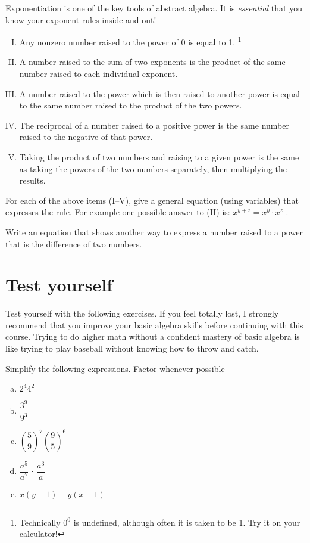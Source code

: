 Exponentiation is one of the key tools of abstract algebra. It is \emph{essential} that you know your exponent rules inside and out!  

\begin{enumerate}[(I)]
\item
Any nonzero number raised to the power of 0 is equal to 1.
\footnote{ Technically $0^0$ is undefined, although often it is taken to be 1. Try it on your calculator!}
\item
A number raised to the sum of two exponents  is the product of the same number raised to each individual exponent.
\item
A number raised to the power which is then raised to another power is equal to the same number raised to the product of the two powers.
\item
The reciprocal of a number raised to a positive power is the same number raised to the negative of that power.
\item
Taking the  product of two numbers  and raising to a given power is the same as taking the powers of the two numbers separately, then multiplying the results.
\end{enumerate}

\begin{exercise}{5}
For each of the above items (I--V),  give a general equation (using variables) that expresses the rule.  For example one possible answer to (II) is:  $x^{y+z} = x^y \cdot x^z$ .
\end{exercise}
\begin{exercise}{6}
Write an equation that shows another way to express a number raised to a power that is the difference of two numbers.
\end{exercise}

\section{Test yourself}
Test yourself with the following exercises. If you feel totally lost, I strongly recommend that you improve your basic algebra skills before continuing with this course. Trying to do higher math without a confident mastery of basic algebra is like trying to play baseball without knowing how to throw and catch.

\begin{exercise}{7}
Simplify the following expressions. Factor whenever possible
\begin{multicols}{2}
\begin{enumerate}[(a)]
\item
$ 2^4 4^2$
\item
$ \dfrac{3^9}{9^3}$
\item
$\left( \dfrac{5}{9} \right)^7 \left( \dfrac{9}{5} \right)^6$
\item
$\dfrac{a^5}{a^7} \, \cdot \, \dfrac{a^3}{a}$
\item
$x(y-1) - y(x-1)$
\end{enumerate}
\end{multicols}
\end{exercise}


